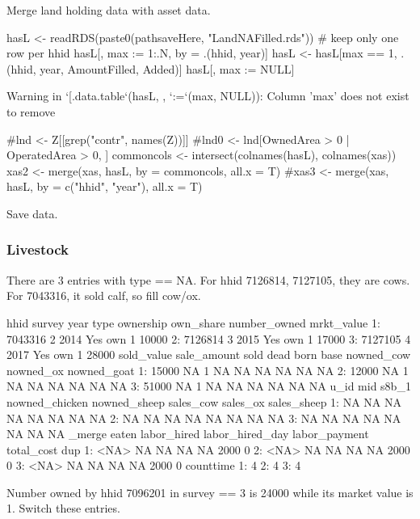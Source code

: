 Merge land holding data with asset data. 
\begin{Schunk}
\begin{Sinput}
hasL <- readRDS(paste0(pathsaveHere, "LandNAFilled.rds"))
# keep only one row per hhid
hasL[, max := 1:.N, by = .(hhid, year)]
hasL <- hasL[max == 1, .(hhid, year, AmountFilled, Added)]
hasL[, max := NULL]
\end{Sinput}
\begin{Soutput}
Warning in `[.data.table`(hasL, , `:=`(max, NULL)): Column 'max' does not exist to remove
\end{Soutput}
\begin{Sinput}
#lnd <- Z[[grep("contr", names(Z))]]
#lnd0 <- lnd[OwnedArea > 0 | OperatedArea > 0, ]
commoncols <- intersect(colnames(hasL), colnames(xas))
xas2 <- merge(xas, hasL, by = commoncols, all.x = T)
#xas3 <- merge(xas, hasL, by = c("hhid", "year"), all.x = T)
\end{Sinput}
\end{Schunk}
Save data.
\begin{Schunk}
\end{Schunk}

\subsubsection{Livestock}


There are 3 entries with \textsf{type} == NA. For hhid 7126814, 7127105, they are cows. For 7043316, it sold calf, so fill cow/ox.
\begin{Schunk}
\begin{Soutput}
      hhid survey year type ownership own_share number_owned mrkt_value
1: 7043316      2 2014            Yes       own            1      10000
2: 7126814      3 2015            Yes       own            1      17000
3: 7127105      4 2017            Yes       own            1      28000
   sold_value sale_amount sold dead born base nowned_cow nowned_ox nowned_goat
1:      15000          NA    1   NA   NA   NA         NA        NA          NA
2:      12000          NA    1   NA   NA   NA         NA        NA          NA
3:      51000          NA    1   NA   NA   NA         NA        NA          NA
   u_id mid s8b_1 nowned_chicken nowned_sheep sales_cow sales_ox sales_sheep
1:   NA  NA    NA             NA           NA        NA       NA          NA
2:   NA  NA    NA             NA           NA        NA       NA          NA
3:   NA  NA    NA             NA           NA        NA       NA          NA
   _merge eaten labor_hired labor_hired_day labor_payment total_cost dup
1:   <NA>    NA          NA              NA            NA       2000   0
2:   <NA>    NA          NA              NA            NA       2000   0
3:   <NA>    NA          NA              NA            NA       2000   0
   counttime
1:         4
2:         4
3:         4
\end{Soutput}
\end{Schunk}
Number owned by hhid 7096201 in survey == 3 is 24000 while its market value is 1. Switch these entries.


